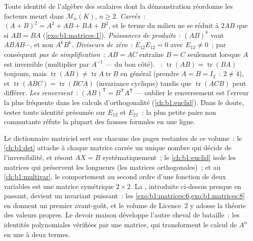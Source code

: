 \begin{remark}
\label{rem:b1:matrices:pitfalls}
Toute identité de l'algèbre des scalaires dont la démonstration
réordonne les facteurs meurt dans $\mathcal{M}_n(K)$, $n \geq 2$.
\emph{Carrés}~: $(A + B)^2 = A^2 + AB + BA + B^2$, et le terme du
milieu ne se réduit à $2AB$ que si $AB = BA$
(\cref{exo:b1:matrices:1}).
\emph{Puissances de produits}~: $(AB)^k$ vaut $ABAB\cdots$, et non
$A^kB^k$.
\emph{Diviseurs de zéro}~: $E_{12}E_{12} = 0$ avec $E_{12} \neq 0$~;
par conséquent \emph{pas de simplification}~: $AB = AC$ entraîne
$B = C$ seulement lorsque $A$ est inversible (multiplier par $A^{-1}$
--- du bon côté).
\emph{}~: $\operatorname{tr}(AB) = \operatorname{tr}(BA)$
toujours, mais $\operatorname{tr}(AB) \neq
\operatorname{tr}A\operatorname{tr}B$ en général (prendre $A = B =
I_2$~: $2 \neq 4$), et $\operatorname{tr}(ABC) =
\operatorname{tr}(BCA)$ (invariance cyclique) tandis que
$\operatorname{tr}(ACB)$ peut différer.
\emph{Les  renversent}~: $(AB)^{\mathsf T} = B^{\mathsf
T}A^{\mathsf T}$ --- oublier le renversement est l'erreur la plus
fréquente dans les calculs d'orthogonalité (\cref{ch:b1:euclid}).
Dans le doute, tester toute identité présumée sur $E_{12}$ et
$E_{21}$~: la plus petite paire non commutante réfute la plupart des
fausses formules en une ligne.
\end{remark}

\begin{remark}
\label{rem:b1:matrices:whereused}
Le dictionnaire matriciel sert sur chacune des pages restantes de ce
volume~: le \cref{ch:b1:det} attache à chaque matrice carrée un unique
nombre qui décide de l'inversibilité, et résout $AX = B$
systématiquement~; le \cref{ch:b1:euclid} isole les matrices qui
préservent les longueurs (les matrices orthogonales)~; et au
\cref{ch:b1:multivar}, le comportement au second ordre d'une fonction
de deux variables est une matrice symétrique $2 \times 2$. La ,
introduite ci-dessus presque en passant, devient un invariant
puissant~: les \cref{exo:b1:matrices:6,exo:b1:matrices:8} en donnent un
premier avant-goût, et le volume de Licence~2 y adosse la théorie des
valeurs propres. Le devoir maison développe l'autre cheval de
bataille~: les identités polynomiales vérifiées par une matrice, qui
transforment le calcul de $A^n$ en une  à deux
termes.
\end{remark}

